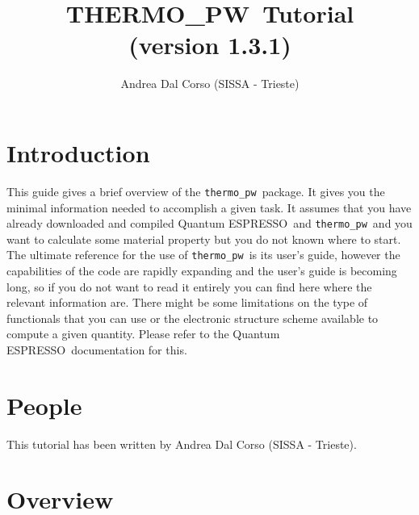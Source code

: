 \documentclass[12pt,a4paper]{article}
\def\version{1.3.1}
\def\qe{{\sc Quantum ESPRESSO}}
\def\tpw{{\sc THERMO\_PW}}
\def\thermo{\texttt{thermo\_pw}}
\begin{document}
 
\author{Andrea Dal Corso (SISSA - Trieste)}
\date{}


\title{
  \vskip 1cm
  {\color{red} \Huge \tpw\ Tutorial} \\
  \Large (version \version)
}

\maketitle

\newpage
\tableofcontents

\newpage

\section{\color{coral}Introduction}

This guide gives a brief overview of the \thermo\ package. 
It gives you the minimal information needed to accomplish a given task.
It assumes that you have already downloaded and compiled \qe\ and \thermo\  
and you want to calculate some material property but you do not known where 
to start. 
The ultimate reference for the use of \thermo\ is its user's guide,
however the capabilities of the code are rapidly expanding and the 
user's guide is becoming long, so if you do not want
to read it entirely you can find here where the relevant information are.
There might be some limitations on the type of functionals that you can use 
or the electronic structure scheme available to compute a given quantity.
Please refer to the \qe\ documentation for this.

\newpage

\section{\color{coral}People}
This tutorial has been written by Andrea Dal Corso (SISSA - Trieste). 

\newpage

\section{\color{coral}Overview}
\end{document}
